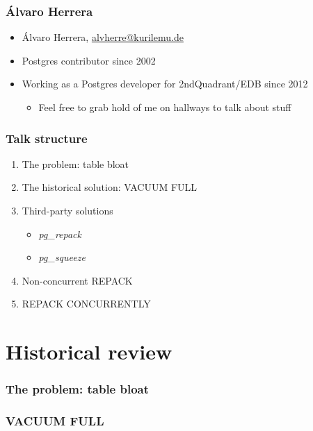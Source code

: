 \newcommand{\linksize}{\scriptsize}


\begin{frame}[plain]
  \titlepage
\end{frame}

\begin{frame}
	\frametitle{Álvaro Herrera}
  \begin{itemize}
    \item Álvaro Herrera, \href{mailto:alvherre@kurilemu.de}{alvherre@kurilemu.de}
    \item Postgres contributor since 2002
    \item Working as a Postgres developer for 2ndQuadrant/EDB since 2012
\begin{itemize} \item \linksize Feel free to grab hold of me on hallways to talk about stuff \end{itemize}
  \end{itemize}
\end{frame}

\begin{frame}
  \frametitle{Talk structure}
  \begin{enumerate}
    \item The problem: table bloat
    \item The historical solution: VACUUM FULL
    \item Third-party solutions
	    \begin{itemize}
		    \item \emph{pg\_repack}
		    \item \emph{pg\_squeeze}
	    \end{itemize}
    \item Non-concurrent REPACK
    \item REPACK CONCURRENTLY
  \end{enumerate}
\end{frame}

\section{Historical review}

\begin{frame}
	\frametitle{The problem: table bloat}
\end{frame}

\begin{frame}
	\frametitle{VACUUM FULL}
\end{frame}

